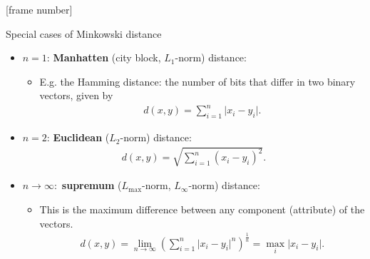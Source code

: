 \documentclass[aspectratio=169,t]{beamer}
\begin{document}
  {
    [frame number]
    \begin{frame}{Special cases of Minkowski distance}
    \begin{itemize}
      \item $n=1$: \textbf{Manhatten} (city block, $L_1$-norm) distance:
      \begin{itemize}
        \item E.g. the Hamming distance: the number of bits that differ in two binary vectors, given by
        \begin{align}
          d(x,y) = \sum_{i=1}^{n} \vert x_i - y_i \vert.
        \end{align}
      \end{itemize}
      \item $n=2$: \textbf{Euclidean} ($L_2$-norm) distance:
            \begin{align}
              d(x,y) = \sqrt{\sum_{i=1}^{n} (x_i-y_i)^2}.
            \end{align}
      \item $n \rightarrow \infty:$ \textbf{supremum} ($L_{\text{max}}$-norm, $L_\infty$-norm) distance:
      \begin{itemize}
        \item This is the maximum difference between any component (attribute) of the vectors.
        \begin{align}
          d(x,y) = \lim_{n \rightarrow \infty} \left( \sum_{i=1}^{n} \vert x_i - y_i \vert^{n} \right)^{\frac{1}{n}} = \max_i \vert x_i-y_i \vert.
        \end{align}
      \end{itemize}
    \end{itemize}
    \end{frame}
  }
\end{document}
